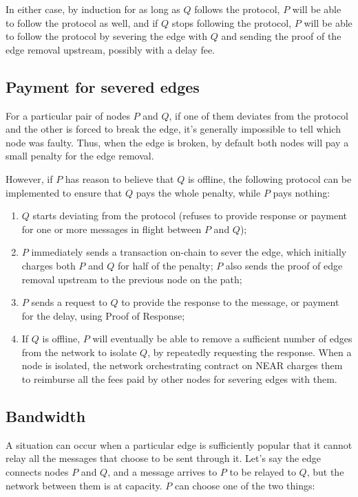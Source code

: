 \documentclass{article}
\begin{document}
In either case, by induction for as long as \( Q \) follows the protocol, \( P \) will be able to follow the protocol as well, and if \( Q \) stops following the protocol, \( P \) will be able to follow the protocol by severing the edge with \( Q \) and sending the proof of the edge removal upstream, possibly with a delay fee.

\subsection{Payment for severed edges}

For a particular pair of nodes \( P \) and \( Q \), if one of them deviates from the protocol and the other is forced to break the edge, it's generally impossible to tell which node was faulty. Thus, when the edge is broken, by default both nodes will pay a small penalty for the edge removal.

However, if \( P \) has reason to believe that \( Q \) is offline, the following protocol can be implemented to ensure that \( Q \) pays the whole penalty, while \( P \) pays nothing:

\begin{enumerate}
    \item \( Q \) starts deviating from the protocol (refuses to provide response or payment for one or more messages in flight between \( P \) and \( Q \));
    \item \( P \) immediately sends a transaction on-chain to sever the edge, which initially charges both \( P \) and \( Q \) for half of the penalty; \( P \) also sends the proof of edge removal upstream to the previous node on the path;
    \item \( P \) sends a request to \( Q \) to provide the response to the message, or payment for the delay, using Proof of Response;
    \item If \( Q \) is offline, \( P \) will eventually be able to remove a sufficient number of edges from the network to isolate \( Q \), by repeatedly requesting the response. When a node is isolated, the network orchestrating contract on NEAR charges them to reimburse all the fees paid by other nodes for severing edges with them.
\end{enumerate}

\subsection{Bandwidth}

A situation can occur when a particular edge is sufficiently popular that it cannot relay all the messages that choose to be sent through it. Let's say the edge connects nodes \( P \) and \( Q \), and a message arrives to \( P \) to be relayed to \( Q \), but the network between them is at capacity. \( P \) can choose one of the two things:
\end{document}
